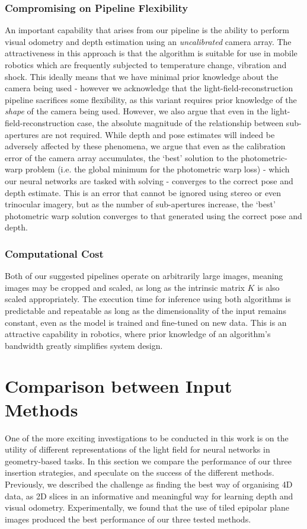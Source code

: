 \subsubsection{Compromising on Pipeline Flexibility}
An important capability that arises from our pipeline is the ability to perform visual odometry and depth estimation using an \textit{uncalibrated} camera array. The attractiveness in this approach is that the algorithm is suitable for use in mobile robotics which are frequently subjected to temperature change, vibration and shock. This ideally means that we have minimal prior knowledge about the camera being used - however we acknowledge that the light-field-reconstruction pipeline sacrifices some flexibility, as this variant requires prior knowledge of the \textit{shape} of the camera being used. However, we also argue that even in the light-field-reconstruction case, the absolute magnitude of the relationship between sub-apertures are not required. While depth and pose estimates will indeed be adversely affected by these phenomena, we argue that even as the calibration error of the camera array accumulates, the `best' solution to the photometric-warp problem (i.e. the global minimum for the photometric warp loss) - which our neural networks are tasked with solving - converges to the correct pose and depth estimate. This is an error that cannot be ignored using stereo or even trinocular imagery, but as the number of sub-apertures increase, the `best' photometric warp solution converges to that generated using the correct pose and depth. 

\subsubsection{Computational Cost}
Both of our suggested pipelines operate on arbitrarily large images, meaning images may be cropped and scaled, as long as the intrinsic matrix $K$ is also scaled appropriately. The execution time for inference using both algorithms is predictable and repeatable as long as the dimensionality of the input remains constant, even as the model is trained and fine-tuned on new data. This is an attractive capability in robotics, where prior knowledge of an algorithm's bandwidth greatly simplifies system design. 


\section{Comparison between Input Methods}
One of the more exciting investigations to be conducted in this work is on the utility of different representations of the light field for neural networks in geometry-based tasks. In this section we compare the performance of our three insertion strategies, and speculate on the success of the different methods. Previously, we described the challenge as finding the best way of organising 4D data, as 2D slices in an informative and meaningful way for learning depth and visual odometry. Experimentally, we found that the use of tiled epipolar plane images produced the best performance of our three tested methods.

